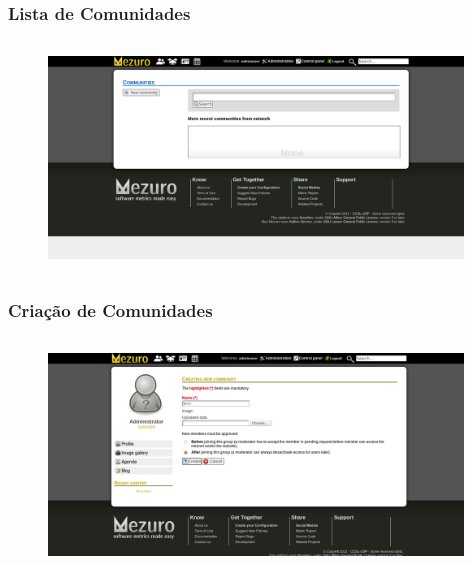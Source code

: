 \documentclass{beamer}
\begin{document}
    \begin{frame}
      \frametitle{Lista de Comunidades}
      \framesubtitle{}

      \begin{figure}
        \begin{center}
          \includegraphics[width=11cm, height=6cm]{images/01-community-list.png}
          \label{fig:}
        \end{center}
      \end{figure}
    \end{frame}

    \begin{frame}
      \frametitle{Criação de Comunidades}
      \framesubtitle{}

      \begin{figure}
        \begin{center}
          \includegraphics[width=11cm, height=6cm]{images/02-community-creation.png}
          \label{fig:}
        \end{center}
      \end{figure}
    \end{frame}
\end{document}
